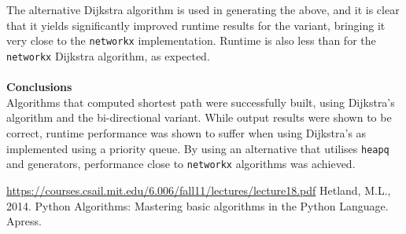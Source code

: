 \documentclass[paper=a4, fontsize=11pt]{scrartcl} %
\begin{document}
\\\\
{The alternative Dijkstra algorithm is used in generating the above, and it is clear that it yields significantly improved runtime results for the variant, bringing it very close to the \texttt{networkx} implementation. Runtime is also less than for the \texttt{networkx} Dijkstra algorithm, as expected.}\\\\
{\bf Conclusions}\\
{Algorithms that computed shortest path were successfully built, using Dijkstra's algorithm and the bi-directional variant. While output results were shown to be correct, runtime performance was shown to suffer when using Dijkstra's as implemented using a priority queue. By using an alternative that utilises \texttt{heapq} and generators, performance close to \texttt{networkx} algorithms was achieved.}
\clearpage
\begin{thebibliography}{9}
 \url{https://courses.csail.mit.edu/6.006/fall11/lectures/lecture18.pdf}
 {Hetland, M.L., 2014. Python Algorithms: Mastering basic algorithms in the Python Language. Apress.}
\end{thebibliography}
\end{document}
